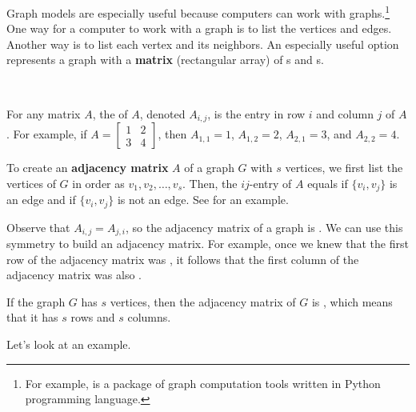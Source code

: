 Graph models are especially useful because computers can work with graphs.\footnote{For example,  is a package of graph computation tools written in Python programming language.}  One way for a computer to work with a graph is to list the vertices and edges. Another way is to list each vertex and its neighbors.  An especially useful option represents a graph with a \textbf{matrix} (rectangular array) of s and s. 

\begin{defn}
\label{defn_adj_matrix}
~
    \begin{apart}
        \item For any matrix $A$, the  of $A$, denoted $A_{i,j}$, is the entry in row $i$ and column $j$ of $A$.  For example, if $A= \left[ \begin{array}{cc} 1 & 2 \\ 3 & 4 \end{array} \right]$, then $A_{1,1}= 1$, $A_{1,2}= 2$, $A_{2,1}= 3$, and $A_{2,2}= 4$.
        \item To create an \textbf{adjacency matrix} $A$ of a graph $G$ with $s$ vertices, we first list the vertices of $G$ in order as $v_1, v_2, \ldots, v_s$.  Then, the $ij$-entry of $A$ equals  if $\{v_i,v_j\}$ is an edge and  if $\{v_i,v_j\}$ is not an edge. See  for an example.
               
        \item Observe that $A_{i,j}=A_{j,i}$, so the adjacency matrix of a graph is .  We can use this symmetry to build an adjacency matrix.  For example,  once we knew that the first row of the adjacency matrix was , it follows that the first column of the adjacency matrix was also .  
        \item If the graph $G$ has $s$ vertices, then the adjacency matrix of $G$ is , which means that it has $s$ rows and $s$ columns.
    \end{apart}
\end{defn}

Let's look at an example.

